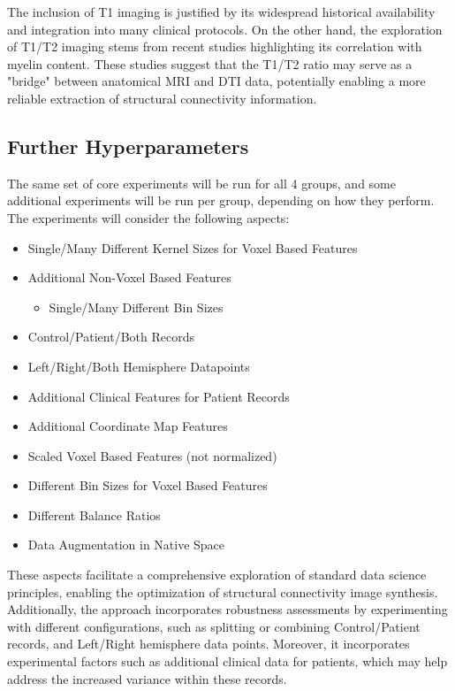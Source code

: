 The inclusion of T1 imaging is justified by its widespread historical availability and integration into many clinical protocols. On the other hand, the exploration of T1/T2 imaging stems from recent studies highlighting its correlation with myelin content. These studies suggest that the T1/T2 ratio may serve as a "bridge" between anatomical \ac{MRI} and \ac{DTI} data, potentially enabling a more reliable extraction of structural connectivity information.

\subsection{Further Hyperparameters}

The same set of core experiments will be run for all 4 groups, and some additional experiments will be run per group, depending on how they perform. The experiments will consider the following aspects:
\begin{itemize}
  \item Single/Many Different Kernel Sizes for Voxel Based Features
  \item Additional Non-Voxel Based Features
  \begin{itemize}
    \item Single/Many Different Bin Sizes
  \end{itemize}
  \item Control/Patient/Both Records
  \item Left/Right/Both Hemisphere Datapoints
  \item Additional Clinical Features for Patient Records
  \item Additional Coordinate Map Features
  \item Scaled Voxel Based Features (not normalized)
  \item Different Bin Sizes for Voxel Based Features
  \item Different Balance Ratios
  \item Data Augmentation in Native Space
\end{itemize}

These aspects facilitate a comprehensive exploration of standard data science principles, enabling the optimization of structural connectivity image synthesis. Additionally, the approach incorporates robustness assessments by experimenting with different configurations, such as splitting or combining Control/Patient records, and Left/Right hemisphere data points. Moreover, it incorporates experimental factors such as additional clinical data for patients, which may help address the increased variance within these records.

